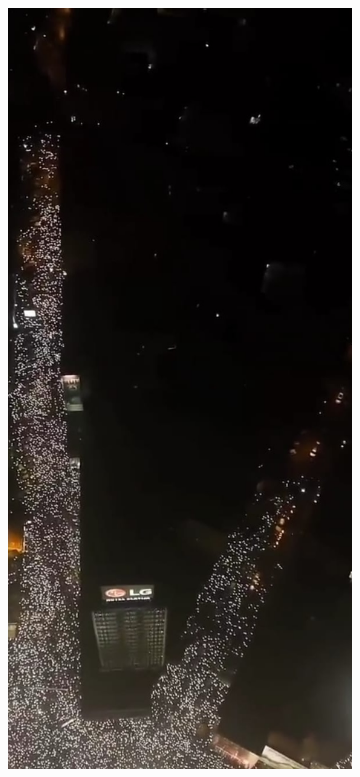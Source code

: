 \documentclass[a4paper,12pt]{article}
\begin{document}
\begin{figure}[H]
	\begin{subfigure}[b]{0.3\textwidth}
	  \centering
	  \includegraphics[width=\textwidth]{../images/makenzijeva.jpeg}

\end{subfigure}
\end{figure}
\end{document}
